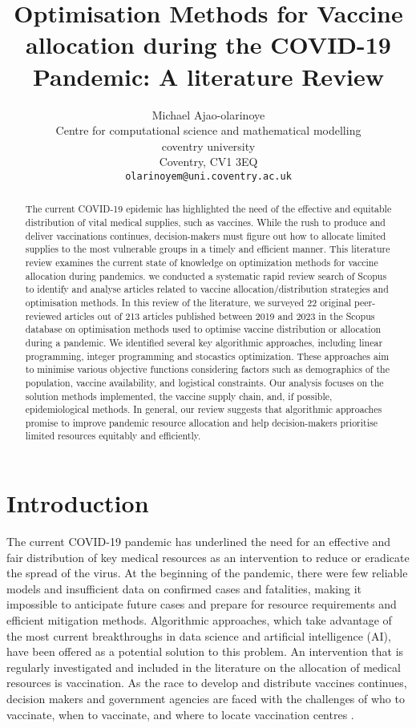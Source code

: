 \documentclass{article}
\title{Optimisation Methods for Vaccine allocation during the COVID-19 Pandemic: A literature Review}
\author{
    Michael Ajao-olarinoye\\
    Centre for computational science and mathematical modelling\\
    coventry university\\
    Coventry, CV1 3EQ \\
    \texttt{olarinoyem@uni.coventry.ac.uk}
}
\begin{document}
\maketitle

\begin{abstract}
    The current COVID-19 epidemic has highlighted the need of the effective and equitable distribution of vital medical supplies, such as vaccines. While the rush to produce and deliver vaccinations continues, decision-makers must figure out how to allocate limited supplies to the most vulnerable groups in a timely and efficient manner. This literature review examines the current state of knowledge on optimization methods for vaccine allocation during pandemics. we conducted a systematic rapid review search of Scopus to identify and analyse articles related to vaccine allocation/distribution strategies and optimisation methods. In this review of the literature, we surveyed 22 original peer-reviewed articles out of 213 articles published between 2019 and 2023 in the Scopus database on optimisation methods used to optimise vaccine distribution or allocation during a pandemic. We identified several key algorithmic approaches, including linear programming, integer programming and stocastics optimization. These approaches aim to minimise various objective functions considering factors such as demographics of the population, vaccine availability, and logistical constraints. Our analysis focuses on the solution methods implemented, the vaccine supply chain, and, if possible, epidemiological methods. In general, our review suggests that algorithmic approaches promise to improve pandemic resource allocation and help decision-makers prioritise limited resources equitably and efficiently.
\end{abstract}


\section{Introduction}
\label{sec:intro}

The current COVID-19 pandemic has underlined the need for an effective and fair distribution of key medical resources as an intervention to reduce or eradicate the spread of the virus. At the beginning of the pandemic, there were few reliable models and insufficient data on confirmed cases and fatalities, making it impossible to anticipate future cases and prepare for resource requirements and efficient mitigation methods. Algorithmic approaches, which take advantage of the most current breakthroughs in data science and artificial intelligence (AI), have been offered as a potential solution to this problem. An intervention that is regularly investigated and included in the literature on the allocation of medical resources is vaccination. As the race to develop and distribute vaccines continues, decision makers and government agencies are faced with the challenges of who to vaccinate, when to vaccinate, and where to locate vaccination centres \cite{Bertsimas2022179}.
\end{document}
